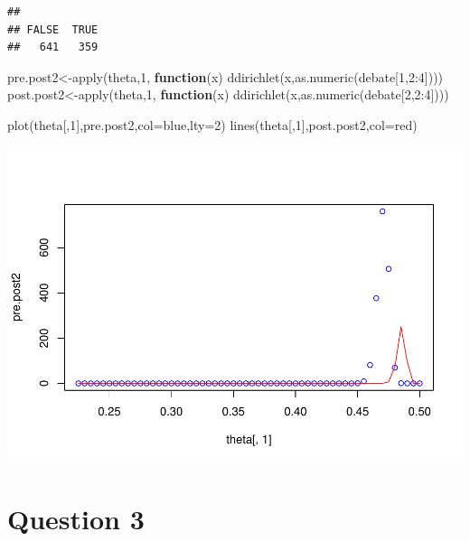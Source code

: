 \documentclass[
]{book}
\newenvironment{Shaded}{\begin{snugshade}}{\end{snugshade}}
\newcommand{\AttributeTok}[1]{\textcolor[rgb]{0.77,0.63,0.00}{#1}}
\newcommand{\ControlFlowTok}[1]{\textcolor[rgb]{0.13,0.29,0.53}{\textbf{#1}}}
\newcommand{\DecValTok}[1]{\textcolor[rgb]{0.00,0.00,0.81}{#1}}
\newcommand{\FunctionTok}[1]{\textcolor[rgb]{0.00,0.00,0.00}{#1}}
\newcommand{\NormalTok}[1]{#1}
\newcommand{\OtherTok}[1]{\textcolor[rgb]{0.56,0.35,0.01}{#1}}
\newcommand{\SpecialCharTok}[1]{\textcolor[rgb]{0.00,0.00,0.00}{#1}}
\newcommand{\StringTok}[1]{\textcolor[rgb]{0.31,0.60,0.02}{#1}}
\theoremstyle{definition}
\theoremstyle{definition}
\theoremstyle{definition}
\theoremstyle{definition}
\theoremstyle{remark}
\begin{document}
\begin{verbatim}
## 
## FALSE  TRUE 
##   641   359
\end{verbatim}

\begin{Shaded}
\begin{Highlighting}[]
\NormalTok{ pre.post2}\OtherTok{\textless{}{-}}\FunctionTok{apply}\NormalTok{(theta,}\DecValTok{1}\NormalTok{, }\ControlFlowTok{function}\NormalTok{(x) }\FunctionTok{ddirichlet}\NormalTok{(x,}\FunctionTok{as.numeric}\NormalTok{(debate[}\DecValTok{1}\NormalTok{,}\DecValTok{2}\SpecialCharTok{:}\DecValTok{4}\NormalTok{])))}
\NormalTok{ post.post2}\OtherTok{\textless{}{-}}\FunctionTok{apply}\NormalTok{(theta,}\DecValTok{1}\NormalTok{, }\ControlFlowTok{function}\NormalTok{(x) }\FunctionTok{ddirichlet}\NormalTok{(x,}\FunctionTok{as.numeric}\NormalTok{(debate[}\DecValTok{2}\NormalTok{,}\DecValTok{2}\SpecialCharTok{:}\DecValTok{4}\NormalTok{])))}
 
  \FunctionTok{plot}\NormalTok{(theta[,}\DecValTok{1}\NormalTok{],pre.post2,}\AttributeTok{col=}\StringTok{\textquotesingle{}blue\textquotesingle{}}\NormalTok{,}\AttributeTok{lty=}\DecValTok{2}\NormalTok{)}
  \FunctionTok{lines}\NormalTok{(theta[,}\DecValTok{1}\NormalTok{],post.post2,}\AttributeTok{col=}\StringTok{\textquotesingle{}red\textquotesingle{}}\NormalTok{)}
\end{Highlighting}
\end{Shaded}

\includegraphics{_main_files/figure-latex/unnamed-chunk-30-2.pdf}

\hypertarget{question-3-1}{%
\section*{Question 3}\label{question-3-1}}
\end{document}
